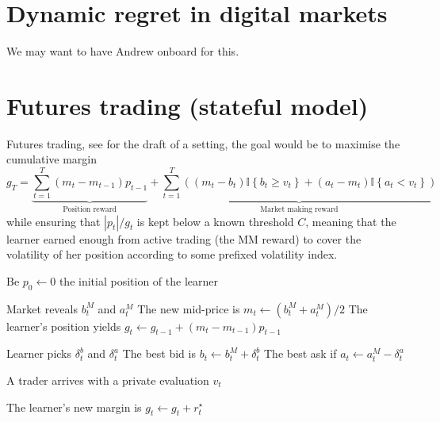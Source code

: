 \documentclass[a4paper,11pt]{article}
\newcommand{\lcb}[1]{\left\{#1\right\}}
\newcommand{\I}[1]{\mathbb{I}\lcb{#1}}
\begin{document}
\tableofcontents

\section{Dynamic regret in digital markets} We may want to have Andrew onboard for this.

\section{Futures trading (stateful model)}
Futures trading, see  for the draft of a setting, the goal would be to maximise the cumulative margin
\[
    g_T
=
    \underbrace{\sum_{t=1}^T (m_t - m_{t-1}) p_{t-1}}_{\text{Position reward}}
+
    \underbrace{\sum_{t=1}^T ((m_t - b_t) \I{b_t \ge v_t} + (a_t - m_t) \I{a_t < v_t})}_{\text{Market making reward}}
\]
while ensuring that $|p_t|/g_t$ is kept below a known threshold $C$, meaning that the learner earned enough from active trading (the MM reward) to cover the volatility of her position according to some prefixed volatility index. 

\begin{algorithm}[t]
    \DontPrintSemicolon

    Be $p_0 \gets 0$ the initial position of the learner\;

     {
        Market reveals $b_t^M$ and $a_t^M$\;
        The new mid-price is $m_t \gets (b_t^M + a_t^M) / 2$\;
        The learner's position yields $g_t \gets g_{t-1} + (m_t - m_{t-1}) p_{t-1}$\;

        \;

        Learner picks $\delta_t^b$ and $\delta_t^a$\;
        The best bid is $b_t \gets b_t^M + \delta_t^b$\;
        The best ask if $a_t \gets a_t^M - \delta_t^a$\;

        \;

        A trader arrives with a private evaluation $v_t$\;
        

        \;

        The learner's new margin is $g_t \gets g_t + r^\star_t$\;

    }
    \caption{Futures trading}
    \label{alg:futures}
\end{algorithm}
\end{document}
